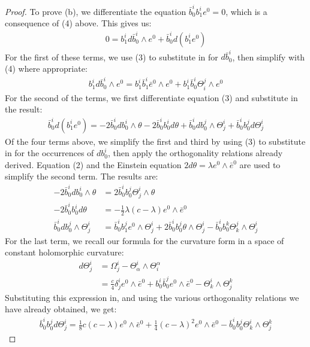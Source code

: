 \documentclass[11pt]{amsart}
\theoremstyle{definition}
\theoremstyle{definition}
\begin{document}
\begin{proof}
To prove (b), we differentiate the equation $\bar{b}^i_0 b^i_1 e^0 = 0$, which is a consequence of (4) above.  This gives us:
%
\begin{align*}
0 = b^i_1 d \bar{b}^i_0 \wedge e^0 + \bar{b}^i_0 d( b^i_1 e^0 )
\end{align*}
%
For the first of these terms, we use (3) to substitute in for $d \bar{b}^i_0$, then simplify with (4) where appropriate:
%
\begin{align*}
b^i_1 d \bar{b}^i_0 \wedge e^0 = b^i_1 \bar{b}^i_1 \bar{e}^0 \wedge e^0 + b^i_1 \bar{b}^i_0 \Theta^j_i \wedge e^0
\end{align*}
%
For the second of the terms, we first differentiate equation (3) and substitute in the result:
%
\begin{align*}
\bar{b}^i_0 d( b^i_1 e^0 ) = -2 \bar{b}^i_0 d b^i_0 \wedge \theta - 2 \bar{b}^i_0 b^i_0 d \theta + \bar{b}^i_0 d b^j_0 \wedge \Theta^i_j + \bar{b}^i_0 b^j_0 d \Theta^i_j
\end{align*}
%
Of the four terms above, we simplify the first and third by using (3) to substitute in for the occurrences of $d b^i_0$, then apply the orthogonality relations already derived. Equation (2) and the Einstein equation $2 d \theta = \lambda e^0 \wedge \bar{e}^0$ are used to simplify the second term.  The results are:
%
\begin{align*}
-2 \bar{b}^i_0 d b^i_0 \wedge \theta &= 2 \bar{b}^i_0 b^j_0 \Theta^i_j \wedge \theta \\
-2 \bar{b}^i_0 b^i_0 d \theta &= - \frac{1}{2} \lambda ( c - \lambda ) e^0 \wedge \bar{e}^0 \\
\bar{b}^i_0 d b^j_0 \wedge \Theta^i_j &= \bar{b}^i_0 b^j_1 e^0 \wedge \Theta^i_j + 2 \bar{b}^i_0 b^j_0  \theta \wedge \Theta^i_j - \bar{b}^i_0 b^k_0 \Theta^j_k \wedge \Theta^i_j
\end{align*}
%
For the last term, we recall our formula for the curvature form in a space of constant holomorphic curvature:
%
\begin{align*}
d \Theta^i_j &= \Omega^i_j - \Theta^i_{\alpha} \wedge \Theta^{\alpha}_i \\
&= \frac{c}{4} \delta^i_j e^0 \wedge \bar{e}^0 + b^i_0 \bar{b}^j_0 e^0 \wedge \bar{e}^0 - \Theta^i_k \wedge \Theta^k_j
\end{align*}
%
Substituting this expression in, and using the various orthogonality relations we have already obtained, we get:
%
\begin{align*}
\bar{b}^i_0 b^j_0 d \Theta^i_j = \frac{1}{8} c (c- \lambda) e^0 \wedge \bar{e}^0 + \frac{1}{4} (c - \lambda)^2 e^0 \wedge \bar{e}^0 - \bar{b}^i_0 b^j_0 \Theta^i_k \wedge \Theta^k_j

\end{align*}
\end{proof}
\end{document}
